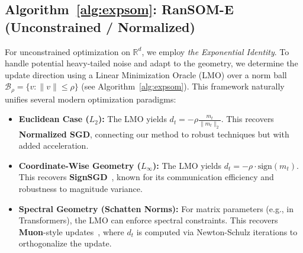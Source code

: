 \documentclass{article}
\theoremstyle{plain}
\theoremstyle{definition}
\theoremstyle{remark}
\begin{document}
\subsection{Algorithm~\ref{alg:expsom}: RanSOM-E (Unconstrained / Normalized)}
For unconstrained optimization on $\mathbb{R}^d$, we employ \textit{the Exponential Identity}. To handle potential heavy-tailed noise and adapt to the geometry, we determine the update direction using a Linear Minimization Oracle (LMO) over a norm ball $\mathcal{B}_\rho = \{v : \|v\| \le \rho\}$ (see Algorithm~\ref{alg:expsom}). This framework naturally unifies several modern optimization paradigms:

\begin{itemize}
    \item \textbf{Euclidean Case ($L_2$):} The LMO yields $d_t = -\rho \frac{m_t}{\|m_t\|_2}$. This recovers \textbf{Normalized SGD}, connecting our method to robust techniques but with added acceleration.
    \item \textbf{Coordinate-Wise Geometry ($L_\infty$):} The LMO yields $d_t = -\rho \cdot \text{sign}(m_t)$. This recovers \textbf{SignSGD}~\cite{bernstein2018signsgd}, known for its communication efficiency and robustness to magnitude variance.
    \item \textbf{Spectral Geometry (Schatten Norms):} For matrix parameters (e.g., in Transformers), the LMO can enforce spectral constraints. This recovers \textbf{Muon}-style updates~\cite{jordan2024muon}, where $d_t$ is computed via Newton-Schulz iterations to orthogonalize the update.
\end{itemize}
\end{document}

